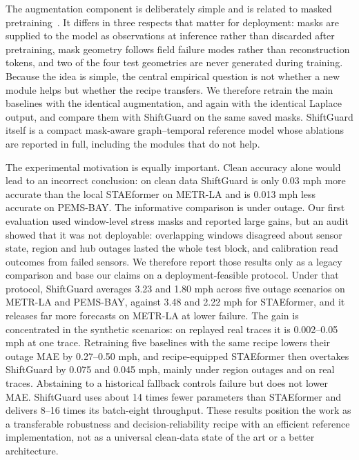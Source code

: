\documentclass[preprint,12pt]{elsarticle}
\begin{document}
The augmentation component is deliberately simple and is related to masked
pretraining~\cite{shao2022step,sun2023stmae,gao2024stdmae}. It differs in three
respects that matter for deployment: masks are supplied to the model as
observations at inference rather than discarded after pretraining, mask
geometry follows field failure modes rather than reconstruction tokens, and two
of the four test geometries are never generated during training. Because the
idea is simple, the central empirical question is not whether a new module
helps but whether the recipe transfers. We therefore retrain the main baselines
with the identical augmentation, and again with the identical Laplace output,
and compare them with ShiftGuard on the same saved masks. ShiftGuard itself is
a compact mask-aware graph--temporal reference model whose ablations are
reported in full, including the modules that do not help.

The experimental motivation is equally important. Clean accuracy alone would
lead to an incorrect conclusion: on clean data ShiftGuard is only 0.03 mph more
accurate than the local STAEformer on METR-LA and is 0.013 mph less accurate on
PEMS-BAY. The informative comparison is under outage. Our first evaluation used
window-level stress masks and reported large gains, but an audit showed that it
was not deployable: overlapping windows disagreed about sensor state, region and
hub outages lasted the whole test block, and calibration read outcomes from
failed sensors. We therefore report those results only as a legacy comparison
and base our claims on a deployment-feasible protocol.
Under that protocol, ShiftGuard averages 3.23 and 1.80 mph across five outage
scenarios on METR-LA and PEMS-BAY, against 3.48 and 2.22 mph for STAEformer, and
it releases far more forecasts on METR-LA at lower failure. The gain is concentrated
in the synthetic scenarios: on replayed real traces it is 0.002--0.05 mph at
one trace. Retraining five baselines with the same recipe lowers their outage MAE
by 0.27--0.50 mph, and recipe-equipped STAEformer then overtakes ShiftGuard by
0.075 and 0.045 mph, mainly under region outages and on real traces. Abstaining to a
historical fallback controls failure but does not lower MAE. ShiftGuard uses about
14 times fewer parameters than STAEformer and delivers 8--16 times its batch-eight
throughput. These results position the work as a
transferable robustness and decision-reliability recipe with an efficient
reference implementation, not as a universal clean-data state of the art or a
better architecture.
\end{document}
